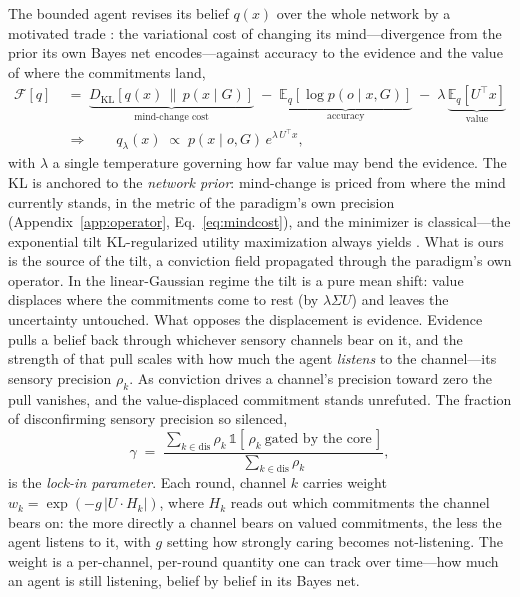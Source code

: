 \documentclass[runningheads]{llncs}
\newcommand{\KL}[2]{D_{\mathrm{KL}}\!\left[#1\,\middle\|\,#2\right]}
\newcommand{\Eq}[2]{\mathbb{E}_{#1}\!\left[#2\right]}
\begin{document}
The bounded agent revises its belief $q(x)$ over the whole network by a motivated trade
\citep{hyland2025}: the variational cost of changing its mind---divergence from the prior its own
Bayes net encodes---against accuracy to the evidence and the value of where the commitments land,
\begin{equation}
\begin{aligned}
\mathcal{F}[q]\;&=\;
\underbrace{\KL{q(x)}{p(x\mid G)}}_{\text{mind-change cost}}
\;-\;\underbrace{\Eq{q}{\log p(o\mid x,G)}}_{\text{accuracy}}
\;-\;\lambda\,\underbrace{\Eq{q}{U^{\!\top}\!x}}_{\text{value}}\\[2pt]
&\Longrightarrow\qquad
q_\lambda(x)\;\propto\;p(x\mid o,G)\,e^{\lambda\,U^{\!\top}\!x},
\end{aligned}
\label{eq:tilted}
\end{equation}
with $\lambda$ a single temperature governing how far value may bend the evidence. The KL is
anchored to the \emph{network prior}: mind-change is priced from where the mind currently
stands, in the metric of the paradigm's own precision (Appendix~\ref{app:operator},
Eq.~\ref{eq:mindcost}), and the minimizer is classical---the exponential tilt KL-regularized
utility maximization always yields \citep{todorov2009,ortega2013}. What is ours is the source
of the tilt, a conviction field propagated through the paradigm's own operator. In the
linear-Gaussian regime the tilt is a pure mean shift: value displaces where the commitments
come to rest (by $\lambda\Sigma U$) and leaves the uncertainty untouched. What opposes the
displacement is evidence. Evidence pulls a belief back through whichever sensory channels bear
on it, and the strength of that pull scales with how much the agent \emph{listens} to the
channel---its sensory precision $\rho_k$. As conviction drives a channel's precision toward
zero the pull vanishes, and the value-displaced commitment stands unrefuted. The fraction
of disconfirming sensory precision so silenced,
\begin{equation}
\gamma\;=\;\frac{\sum_{k\in\mathrm{dis}}\rho_k\,\mathbb{1}[\,\rho_k\ \text{gated by the core}\,]}
{\sum_{k\in\mathrm{dis}}\rho_k},
\label{eq:gamma}
\end{equation}
is the \emph{lock-in parameter}. Each round, channel $k$ carries weight
$w_k=\exp(-g\,|U\!\cdot\!H_k|)$, where $H_k$ reads out which commitments the channel bears on:
the more directly a channel bears on valued commitments, the less the agent listens to it,
with $g$ setting how strongly caring becomes not-listening. The weight is a per-channel,
per-round quantity one can track over time---how much an agent is still listening, belief by
belief in its Bayes net.
\end{document}
